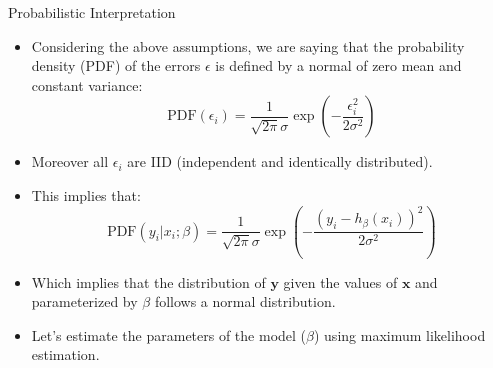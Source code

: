 \documentclass[handout]{beamer}
\begin{document}
\begin{frame}{Probabilistic Interpretation}
\scriptsize{
\begin{itemize}
 \item Considering the above assumptions, we are saying that the probability density (PDF) of the errors $\epsilon$ is defined by a normal of zero mean and constant variance:
 \begin{displaymath}
  \text{PDF}(\epsilon_{i})=\frac{1}{\sqrt{2\pi} \sigma} \exp \left(- \frac{\epsilon_{i}^{2}}{2\sigma^2}\right)
 \end{displaymath}
 \item Moreover all $\epsilon_{i}$ are IID (independent and identically distributed).
 \item This implies that:
  \begin{displaymath}
  \text{PDF}(y_i|x_{i};\beta)=\frac{1}{\sqrt{2\pi} \sigma} \exp \left(- \frac{(y_i - h_{\beta}(x_{i}) )^{2}}{2\sigma^2}\right)
 \end{displaymath}
\item Which implies that the distribution of $\mathbf{y}$ given the values of $\mathbf{x}$ and parameterized by $\beta$ follows a normal distribution.

\item Let's estimate the parameters of the model  ($\beta$) using maximum likelihood estimation.

\end{itemize}

}
 
\end{frame}
\end{document}
